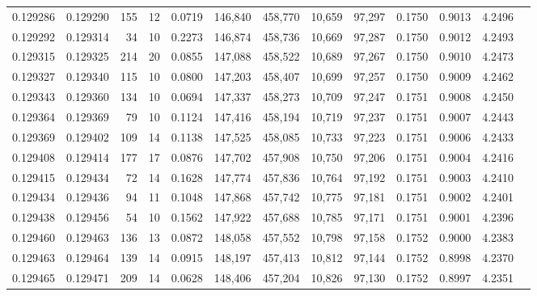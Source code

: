 \begin{tabular}{rrrrrrrrrrrrr}
0.129286 & 0.129290 &   155 &  12 &                                     0.0719 & 146,840 & 458,770 &  10,659 &  97,297 & 0.1750 & 0.9013 & 4.2496 \\
0.129292 & 0.129314 &    34 &  10 &                                     0.2273 & 146,874 & 458,736 &  10,669 &  97,287 & 0.1750 & 0.9012 & 4.2493 \\
0.129315 & 0.129325 &   214 &  20 &                                     0.0855 & 147,088 & 458,522 &  10,689 &  97,267 & 0.1750 & 0.9010 & 4.2473 \\
0.129327 & 0.129340 &   115 &  10 &                                     0.0800 & 147,203 & 458,407 &  10,699 &  97,257 & 0.1750 & 0.9009 & 4.2462 \\
0.129343 & 0.129360 &   134 &  10 &                                     0.0694 & 147,337 & 458,273 &  10,709 &  97,247 & 0.1751 & 0.9008 & 4.2450 \\
0.129364 & 0.129369 &    79 &  10 &                                     0.1124 & 147,416 & 458,194 &  10,719 &  97,237 & 0.1751 & 0.9007 & 4.2443 \\
0.129369 & 0.129402 &   109 &  14 &                                     0.1138 & 147,525 & 458,085 &  10,733 &  97,223 & 0.1751 & 0.9006 & 4.2433 \\
0.129408 & 0.129414 &   177 &  17 &                                     0.0876 & 147,702 & 457,908 &  10,750 &  97,206 & 0.1751 & 0.9004 & 4.2416 \\
0.129415 & 0.129434 &    72 &  14 &                                     0.1628 & 147,774 & 457,836 &  10,764 &  97,192 & 0.1751 & 0.9003 & 4.2410 \\
0.129434 & 0.129436 &    94 &  11 &                                     0.1048 & 147,868 & 457,742 &  10,775 &  97,181 & 0.1751 & 0.9002 & 4.2401 \\
0.129438 & 0.129456 &    54 &  10 &                                     0.1562 & 147,922 & 457,688 &  10,785 &  97,171 & 0.1751 & 0.9001 & 4.2396 \\
0.129460 & 0.129463 &   136 &  13 &                                     0.0872 & 148,058 & 457,552 &  10,798 &  97,158 & 0.1752 & 0.9000 & 4.2383 \\
0.129463 & 0.129464 &   139 &  14 &                                     0.0915 & 148,197 & 457,413 &  10,812 &  97,144 & 0.1752 & 0.8998 & 4.2370 \\
0.129465 & 0.129471 &   209 &  14 &                                     0.0628 & 148,406 & 457,204 &  10,826 &  97,130 & 0.1752 & 0.8997 & 4.2351 \\

\end{tabular}
